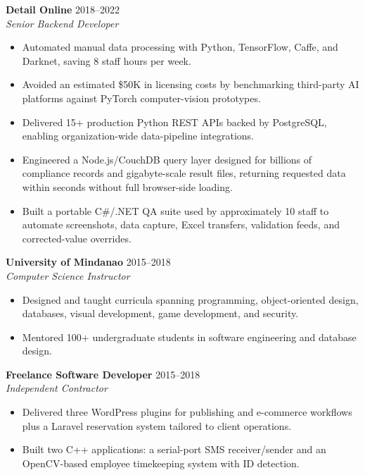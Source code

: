 \documentclass[11pt,letterpaper]{article}
\begin{document}
\vspace{8pt}

\noindent
\textbf{Detail Online} \hfill 2018--2022 \\
\textit{Senior Backend Developer}
\begin{itemize}
    \item Automated manual data processing with Python, TensorFlow, Caffe, and Darknet, saving 8 staff hours per week.
    \item Avoided an estimated \$50K in licensing costs by benchmarking third-party AI platforms against PyTorch computer-vision prototypes.
    \item Delivered 15+ production Python REST APIs backed by PostgreSQL, enabling organization-wide data-pipeline integrations.
    \item Engineered a Node.js/CouchDB query layer designed for billions of compliance records and gigabyte-scale result files, returning requested data within seconds without full browser-side loading.
    \item Built a portable C\#/.NET QA suite used by approximately 10 staff to automate screenshots, data capture, Excel transfers, validation feeds, and corrected-value overrides.
\end{itemize}

\vspace{8pt}

\noindent
\textbf{University of Mindanao} \hfill 2015--2018 \\
\textit{Computer Science Instructor}
\begin{itemize}
    \item Designed and taught curricula spanning programming, object-oriented design, databases, visual development, game development, and security.
    \item Mentored 100+ undergraduate students in software engineering and database design.
\end{itemize}

\vspace{8pt}

\noindent
\textbf{Freelance Software Developer} \hfill 2015--2018 \\
\textit{Independent Contractor}
\begin{itemize}
    \item Delivered three WordPress plugins for publishing and e-commerce workflows plus a Laravel reservation system tailored to client operations.
    \item Built two C++ applications: a serial-port SMS receiver/sender and an OpenCV-based employee timekeeping system with ID detection.
\end{itemize}
\end{document}
